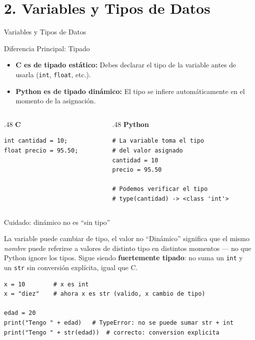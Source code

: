 \documentclass{beamer}
\begin{document}
\section{2. Variables y Tipos de Datos}

\begin{frame}[fragile]{Variables y Tipos de Datos}
  \begin{block}{Diferencia Principal: Tipado}
    \begin{itemize}
        \item \textbf{C es de tipado estático:} Debes declarar el tipo de la variable antes de usarla (\texttt{int}, \texttt{float}, etc.).
        \item \textbf{Python es de tipado dinámico:} El tipo se infiere automáticamente en el momento de la asignación.
    \end{itemize}
  \end{block}

  \begin{columns}[T]
    \begin{column}{.48\textwidth}
      \centering\textbf{C}
      \begin{verbatim}
int cantidad = 10;
float precio = 95.50;
      \end{verbatim}
    \end{column}
    \begin{column}{.48\textwidth}
      \centering\textbf{Python}
      \begin{verbatim}
# La variable toma el tipo
# del valor asignado
cantidad = 10
precio = 95.50

# Podemos verificar el tipo
# type(cantidad) -> <class 'int'>
      \end{verbatim}
    \end{column}
  \end{columns}
\end{frame}

\begin{frame}[fragile]{Cuidado: dinámico no es ``sin tipo''}
  \begin{alertblock}{La variable puede cambiar de tipo, el valor no}
    ``Dinámico'' significa que el mismo \textit{nombre} puede referirse a
    valores de distinto tipo en distintos momentos — no que Python ignore
    los tipos. Sigue siendo \textbf{fuertemente tipado}: no suma un
    \texttt{int} y un \texttt{str} sin conversión explícita, igual que C.
  \end{alertblock}
  \begin{verbatim}
x = 10        # x es int
x = "diez"    # ahora x es str (valido, x cambio de tipo)

edad = 20
print("Tengo " + edad)   # TypeError: no se puede sumar str + int
print("Tengo " + str(edad))  # correcto: conversion explicita
  \end{verbatim}
\end{frame}
\end{document}
